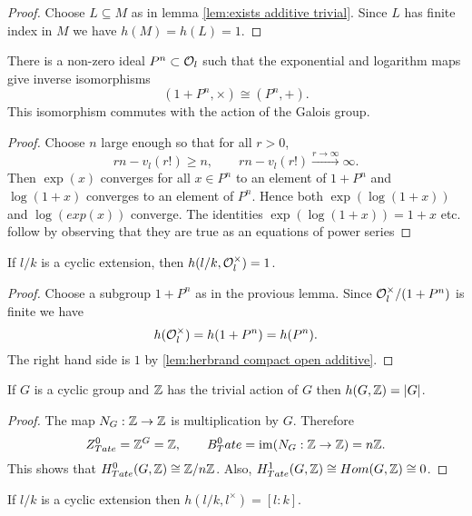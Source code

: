 \begin{proof}
	Choose $L \subseteq M$ as in lemma \ref{lem:exists additive trivial}.
	Since $L$ has finite index in $M$ we have $h(M) = h(L) = 1$.
\end{proof}


\begin{lemma}\label{lem:local isomorphism}
	There is a non-zero ideal $P^n \subset {\mathcal O}_l$ such that the
	exponential and logarithm maps give inverse isomorphisms
	\[
		(1 + P^n, \times) \cong (P^n,+).
	\]
	This isomorphism commutes with the action of the Galois group.
\end{lemma}

\begin{proof}
	Choose $n$ large enough so that for all $r > 0$,
	\[
		rn - v_l(r!) \ge n, \qquad
		rn - v_l(r!) \stackrel{r \to \infty}\to \infty.
	\]
	Then $\exp(x)$ converges for all $x \in P^n$ to an element of $1 + P^n$ and
	$\log(1+x)$ converges to an element of $P^n$.
	Hence both $\exp(\log(1+x))$ and $\log(exp(x))$ converge.
	The identities $\exp(\log(1+x))=1+x$ etc. follow by observing that they are true as
	an equations of power series
\end{proof}


\begin{lemma}\label{lem:herbrand local units}
	If $l/k$ is a cyclic extension, then $h(l/k, {\mathcal O}_l^\times) = 1$.
\end{lemma}

\begin{proof}
	Choose a subgroup $1+P^n$ as in the provious lemma.
	Since ${\mathcal O}_l^\times / (1+P^n)$ is finite we have
	\[
		h({\mathcal O}_l^\times) = h(1+P^n) = h(P^n).
	\]
	The right hand side is $1$ by \ref{lem:herbrand compact open additive}.
\end{proof}

\begin{lemma} \label{lem:herbrand Z}
	If $G$ is a cyclic group and ${\mathbb Z}$ has the trivial action of $G$ then $h(G,{\mathbb Z}) = |G|$.
\end{lemma}

\begin{proof}
	The map	$N_G : {\mathbb Z} \to {\mathbb Z}$ is multiplication by $G$.
	Therefore
	\[
		Z^0_{Tate} = {\mathbb Z}^G = {\mathbb Z}, \qquad
		B^0_Tate = \mathrm{im}(N_G : {\mathbb Z} \to {\mathbb Z}) = n{\mathbb Z}.
	\]
	This shows that $H^0_{Tate}(G,{\mathbb Z})\cong {\mathbb Z} / n{\mathbb Z}$.
	Also,	$H^1_{Tate}(G,{\mathbb Z}) \cong Hom(G,{\mathbb Z}) \cong 0$.
\end{proof}

\begin{lemma} \label{lem:herbrand local l*}
	If $l/k$ is a cyclic extension then $h(l/k, l^\times)= [l:k]$.
\end{lemma}

